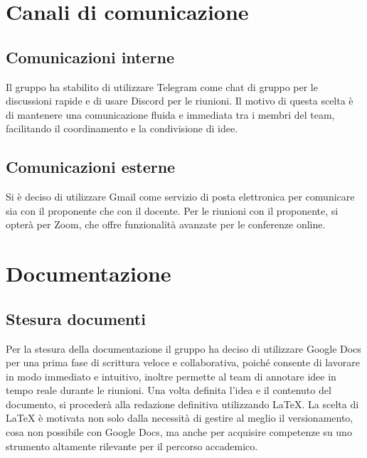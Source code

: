 \documentclass[a4paper, 12pt]{article}
\begin{document}
    \section{Canali di comunicazione}
    
    \subsection{Comunicazioni interne}
    Il gruppo ha stabilito di utilizzare Telegram come chat di gruppo per le discussioni rapide e di usare Discord per le riunioni. 
    Il motivo di questa scelta è di mantenere una comunicazione fluida e immediata tra i membri del team, facilitando il coordinamento e la condivisione di idee.
    
    \subsection{Comunicazioni esterne}
    Si è deciso di utilizzare Gmail come servizio di posta elettronica per comunicare sia con il proponente che con il docente. 
    Per le riunioni con il proponente, si opterà per Zoom, che offre funzionalità avanzate per le conferenze online.

    \section{Documentazione}
    
    \subsection{Stesura documenti}
    Per la stesura della documentazione il gruppo ha deciso di utilizzare Google Docs per una prima fase di scrittura veloce e collaborativa, poiché consente di lavorare in modo immediato e intuitivo, inoltre permette al team di annotare idee in tempo reale durante le riunioni. Una volta definita l’idea e il contenuto del documento, si procederà alla redazione definitiva utilizzando LaTeX. La scelta di LaTeX è motivata non solo dalla necessità di gestire al meglio il versionamento, cosa non possibile con Google Docs, ma anche per acquisire competenze su uno strumento altamente rilevante per il percorso accademico.
    
\end{document}
